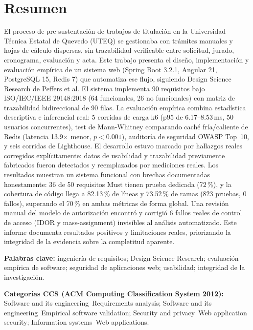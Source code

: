 \section*{Resumen}

El proceso de pre-sustentación de trabajos de titulación en la Universidad Técnica Estatal de Quevedo
(UTEQ) se gestionaba con trámites manuales y hojas de cálculo dispersas, sin trazabilidad verificable
entre solicitud, jurado, cronograma, evaluación y acta. Este trabajo presenta el diseño, implementación y
evaluación empírica de un sistema web (Spring Boot 3.2.1, Angular 21, PostgreSQL 15, Redis 7) que
automatiza ese flujo, siguiendo Design Science Research de Peffers et al. El sistema implementa 90
requisitos bajo ISO/IEC/IEEE 29148:2018 (64 funcionales, 26 no funcionales) con matriz de trazabilidad
bidireccional de 90 filas. La evaluación empírica combina estadística descriptiva e inferencial real:
5 corridas de carga k6 (p95 de 6.17--8.53\,ms, 50 usuarios concurrentes), test de Mann-Whitney comparando
caché fría/caliente de Redis (latencia 13.9$\times$ menor, $p<0.001$), auditoría de seguridad OWASP
Top~10, y seis corridas de Lighthouse. El desarrollo estuvo marcado por hallazgos reales corregidos
explícitamente: datos de usabilidad y trazabilidad previamente fabricados fueron detectados y
reemplazados por mediciones reales. Los resultados muestran un sistema funcional con brechas
documentadas honestamente: 36 de 50 requisitos Must tienen prueba dedicada (72\,\%), y la cobertura de
código llega a 82.13\,\% de líneas y 73.52\,\% de ramas (823 pruebas, 0 fallos), superando el 70\,\% en ambas métricas de forma global. Una
revisión manual del modelo de
autorización encontró y corrigió 6 fallos reales de control de acceso (IDOR y mass-assignment) invisibles
al análisis automatizado. Este informe documenta resultados positivos y limitaciones reales, priorizando
la integridad de la evidencia sobre la completitud aparente.

\textbf{Palabras clave:} ingeniería de requisitos; Design Science Research; evaluación empírica de
software; seguridad de aplicaciones web; usabilidad; integridad de la investigación.

\textbf{Categorías CCS (ACM Computing Classification System 2012):}
Software and its engineering~Requirements analysis;
Software and its engineering~Empirical software validation;
Security and privacy~Web application security;
Information systems~Web applications.

\newpage

